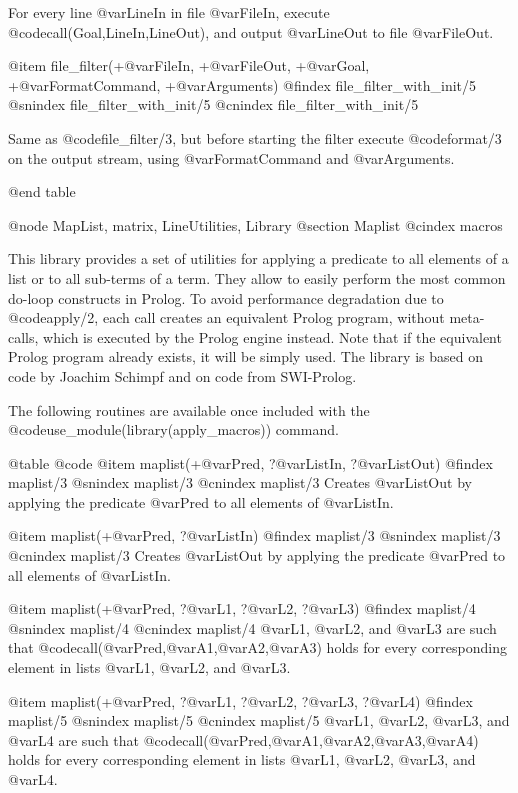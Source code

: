 {{{{{{{{For every line @var{LineIn} in file @var{FileIn}, execute
@code{call(Goal,LineIn,LineOut)}, and output @var{LineOut} to file
@var{FileOut}.

@item file_filter(+@var{FileIn}, +@var{FileOut}, +@var{Goal},
+@var{FormatCommand},   +@var{Arguments})
@findex file_filter_with_init/5
@snindex file_filter_with_init/5
@cnindex file_filter_with_init/5

Same as @code{file_filter/3}, but before starting the filter execute
@code{format/3} on the output stream, using @var{FormatCommand} and
@var{Arguments}.

@end table



@node MapList, matrix, LineUtilities, Library
@section Maplist
@cindex macros

This library provides a set of utilities for applying a predicate to
all elements of a list or to all sub-terms of a term. They allow to
easily perform the most common do-loop constructs in Prolog. To avoid
performance degradation due to @code{apply/2}, each call creates an
equivalent Prolog program, without meta-calls, which is executed by
the Prolog engine instead. Note that if the equivalent Prolog program
already exists, it will be simply used. The library is based on code
by Joachim Schimpf and on code from SWI-Prolog.

The following routines are available once included with the
@code{use_module(library(apply_macros))} command.

@table @code
@item maplist(+@var{Pred}, ?@var{ListIn}, ?@var{ListOut})
@findex maplist/3
@snindex maplist/3
@cnindex maplist/3
      Creates @var{ListOut} by applying the predicate @var{Pred} to all
elements of @var{ListIn}.

@item maplist(+@var{Pred}, ?@var{ListIn})
@findex maplist/3
@snindex maplist/3
@cnindex maplist/3
      Creates @var{ListOut} by applying the predicate @var{Pred} to all
elements of @var{ListIn}.

@item maplist(+@var{Pred}, ?@var{L1}, ?@var{L2}, ?@var{L3})
@findex maplist/4
@snindex maplist/4
@cnindex maplist/4
      @var{L1},  @var{L2}, and @var{L3} are such that
      @code{call(@var{Pred},@var{A1},@var{A2},@var{A3})} holds for every
      corresponding element in lists @var{L1},  @var{L2}, and @var{L3}.

@item maplist(+@var{Pred}, ?@var{L1}, ?@var{L2}, ?@var{L3}, ?@var{L4})
@findex maplist/5
@snindex maplist/5
@cnindex maplist/5
      @var{L1}, @var{L2}, @var{L3}, and @var{L4} are such that
      @code{call(@var{Pred},@var{A1},@var{A2},@var{A3},@var{A4})} holds
      for every corresponding element in lists @var{L1}, @var{L2}, @var{L3}, and
      @var{L4}.

}}}}}}}}
